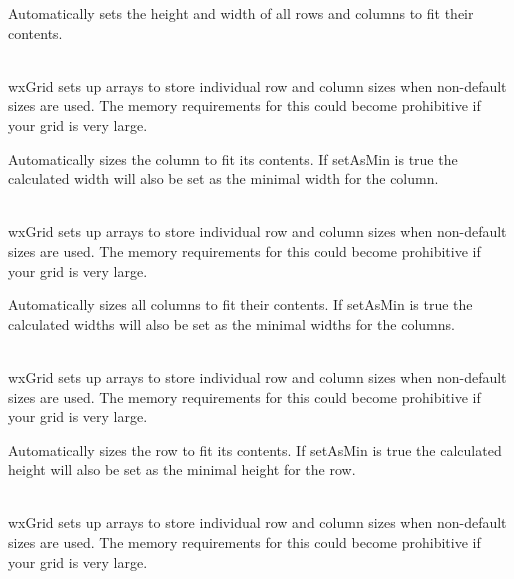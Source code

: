 Automatically sets the height and width of all rows and columns to fit their contents.

\\
wxGrid sets up arrays to store individual row and column sizes when non-default sizes are used.
The memory requirements for this could become prohibitive if your grid is very large. 

\label{wxgridautosizecolumn}


Automatically sizes the column to fit its contents. If setAsMin is true the calculated width will
also be set as the minimal width for the column.

\\
wxGrid sets up arrays to store individual row and column sizes when non-default sizes are used.
The memory requirements for this could become prohibitive if your grid is very large. 

\label{wxgridautosizecolumns}


Automatically sizes all columns to fit their contents. If setAsMin is true the calculated widths will
also be set as the minimal widths for the columns.

\\
wxGrid sets up arrays to store individual row and column sizes when non-default sizes are used.
The memory requirements for this could become prohibitive if your grid is very large. 

\label{wxgridautosizerow}


Automatically sizes the row to fit its contents. If setAsMin is true the calculated height will
also be set as the minimal height for the row.

\\
wxGrid sets up arrays to store individual row and column sizes when non-default sizes are used.
The memory requirements for this could become prohibitive if your grid is very large. 

\label{wxgridautosizerows}


